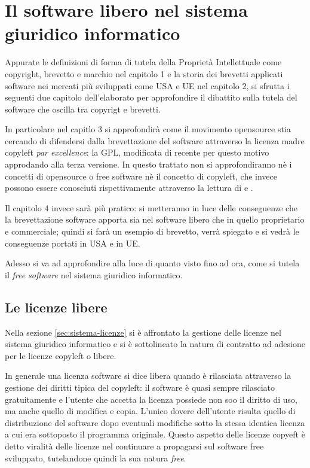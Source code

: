  \chapter{Il software libero nel sistema giuridico informatico}

Appurate le definizioni di forma di tutela della Proprietà Intellettuale come copyright, brevetto e marchio nel capitolo 1 e la storia dei brevetti applicati software nei mercati più sviluppati come USA e UE nel capitolo 2, si sfrutta i seguenti due capitolo dell'elaborato per approfondire il dibattito sulla tutela del software che oscilla tra copyrigt e brevetti.

In particolare nel capitlo 3 si approfondirà come il movimento opensource stia cercando di difendersi dalla brevettazione del software attraverso la licenza madre copyleft \textit{par excellence}: la GPL, modificata di recente per questo motivo approdando alla terza versione.
In questo trattato non si approfondiranno nè i concetti di opensource o free software nè il concetto di copyleft, che invece possono essere conosciuti rispettivamente attraverso la lettura di \cite[Compendio di libertà informatica e cultura open]{Aliprandi-compendio} e \cite[Copyleft e Opencontent]{Aliprandi-copyleft}.

Il capitolo 4 invece sarà più pratico: si metteranno in luce delle conseguenze che la brevettazione software apporta sia nel software libero che in quello proprietario e commerciale; quindi si farà un esempio di brevetto, verrà spiegato e si vedrà le conseguenze portati in USA e in UE.

Adesso si va ad approfondire alla luce di quanto visto fino ad ora, come si tutela il \textit{free software} nel sistema giuridico informatico.


\section{Le licenze libere}

Nella sezione \ref{sec:sistema-licenze} si è affrontato la gestione delle licenze nel sistema giuridico informatico e si è sottolineato la natura di contratto ad adesione per le licenze copyleft o libere.

In generale una licenza software si dice libera quando è rilasciata attraverso la gestione dei diritti tipica del copyleft: il software è quasi sempre rilasciato gratuitamente e l'utente che accetta la licenza possiede non soo il diritto di uso, ma anche quello di modifica e copia. L'unico dovere dell'utente risulta quello di distribuzione del software dopo eventuali modifiche sotto la stessa identica licenza a cui era sottoposto il programma originale. Questo aspetto delle licenze copyeft è detto viralità delle licenze nel continuare a propagarsi sul software free sviluppato, tutelandone quindi la sua natura \textit{free}.

